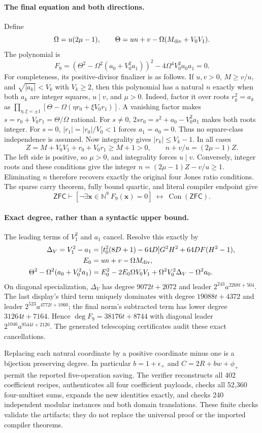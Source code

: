 \paragraph{The final equation and both directions.}
Define
\[
 \Omega=u(2\mu-1),\qquad
 \Theta=un+v-\Omega(M_{\rm div}+V_0V_1).
\]
The polynomial is
\[
 \boxed{\ F_9=(\Theta^2-\Omega^2(a_0+V_0^2a_1))^2
              -4\Omega^4V_0^2a_0a_1=0.\ }
\]
For completeness, its positive-divisor finalizer is as follows. If
$u,v>0$, $M\geq v/u$, and $\sqrt{|a_k|}<V_k$ with $V_k\geq2$,
then this polynomial has a natural $n$ exactly when both $a_k$ are
integer squares, $u\mid v$, and $\mu>0$.
Indeed, factor it over roots $r_k^2=a_k$ as
$\prod_{\eta,\xi=\pm1}[\Theta-\Omega(\eta r_0+\xi V_0r_1)]$.
A vanishing factor makes $s=r_0+V_0r_1=\Theta/\Omega$ rational.
For $s\ne0$, $2sr_0=s^2+a_0-V_0^2a_1$ makes both roots integer.
For $s=0$, $|r_1|=|r_0|/V_0<1$ forces $a_1=a_0=0$.
Thus no square-class independence is assumed. Now integrality gives
$|r_k|\leq V_k-1$. In all cases
\[
 Z=M+V_0V_1+r_0+V_0r_1\geq M+1>0,
 \qquad n+v/u=(2\mu-1)Z.
\]
The left side is positive, so $\mu>0$, and integrality forces $u\mid v$.
Conversely, integer roots and these conditions give the integer
$n=(2\mu-1)Z-v/u\geq1$. Eliminating $n$ therefore recovers exactly
the original four Jones ratio conditions. The sparse carry theorem,
fully bound quartic, and literal compiler endpoint give
\[
 \mathsf{ZFC}\vdash
 [\neg\exists\mathbf x\in\mathbb N^9\ F_9(\mathbf x)=0]
 \ \longleftrightarrow\ \operatorname{Con}(\mathsf{ZFC}).
\]

\paragraph{Exact degree, rather than a syntactic upper bound.}
The leading terms of $V_1^2$ and $a_1$ cancel. Resolve this exactly by
\begin{align*}
 \Delta_V=V_1^2-a_1
  &=[t_0^2(8D+1)-64D]G^2H^2
       +64DF(H^2-1),\\
 E_0&=un+v-\Omega M_{\rm div},\\
 \Theta^2-\Omega^2(a_0+V_0^2a_1)
  &=E_0^2-2E_0\Omega V_0V_1
       +\Omega^2V_0^2\Delta_V-\Omega^2a_0.
\end{align*}
On diagonal specialization, $\Delta_V$ has degree $9072t+2072$
and leader $2^{243}a^{2268t+504}$. The last display's third term uniquely dominates
with degree $19088t+4372$ and leader $2^{523}a^{4772t+1060}$; the final norm's
subtracted term has lower degree $31264t+7164$. Hence
$\deg F_9=38176t+8744$ with diagonal leader $2^{1046}a^{9544t+2120}$.
The generated telescoping certificates audit these exact cancellations.

Replacing each natural coordinate by a positive coordinate minus one is
a bijection preserving degree. In particular $b=1+\epsilon_+$ and
$C=2R+bw+\phi_+$ permit the reported five-operation saving.
The verifier reconstructs all 402 coefficient recipes, authenticates all
four coefficient payloads, checks all 52,360 four-multiset sums, expands
the new identities exactly, and checks 240 independent modular instances
and both domain translations. These finite checks validate the artifacts;
they do not replace the universal proof or the imported compiler theorems.
